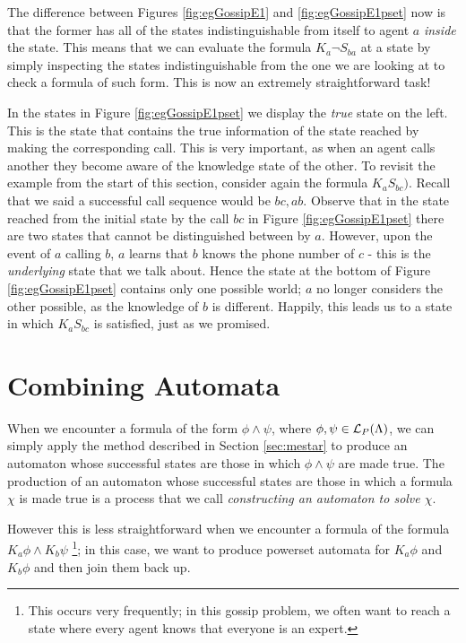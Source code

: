 \documentclass[10pt, a4paper]{report}
\begin{document}
The difference between Figures \ref{fig:egGossipE1} and \ref{fig:egGossipE1pset}
now is that the former has all of the states indistinguishable from itself to
agent $a$ \emph{inside} the state. This means that we can evaluate the formula
$K_a \neg S_{ba}$ at a state by simply inspecting the states indistinguishable
from the one we are looking at to check a formula of such form. This is now an
extremely straightforward task!

In the states in Figure \ref{fig:egGossipE1pset} we display the \emph{true} state on the left.
This is the state that contains the true information of the state reached by
making the corresponding call. This is very important, as when an agent calls
another they become aware of the knowledge state of the other. To revisit the
example from the start of this section, consider again the formula $K_a S_{bc})$.
Recall that we said a successful call sequence would be $bc, ab$. Observe that
in the state reached from the initial state by the call $bc$ in Figure
\ref{fig:egGossipE1pset} there are two states that cannot be distinguished
between by $a$. However, upon the event of $a$ calling $b$, $a$ learns that $b$
knows the phone number of $c$ - this is the \emph{underlying} state that we talk
about. Hence the state at the bottom of Figure \ref{fig:egGossipE1pset} contains
only one possible world; $a$ no longer considers the other possible, as the
knowledge of $b$ is different. Happily, this leads us to a state in which $K_a
S_{bc}$ is satisfied, just as we promised. 

\section{Combining Automata}

When we encounter a formula of the form $\phi \land \psi$, where $\phi, \psi \in
\mathcal{L}_P(\Lambda)$, we can simply apply the method described in Section
\ref{sec:mestar} to produce an automaton whose successful states are those in
which $\phi \land \psi$ are made true. The production of an automaton whose
successful states are those in which a formula $\chi$ is made true is a process
that we call \emph{constructing an automaton to solve $\chi$}.

However this is less straightforward when we encounter a formula of the formula
$K_a \phi \land K_b \psi$ \footnote{This occurs very frequently; in this gossip
  problem, we often want to reach a state where every agent knows that everyone
  is an expert.}; in this case, we want to produce powerset automata for $K_a
\phi$ and $K_b \phi$ and then join them back up.
\end{document}
